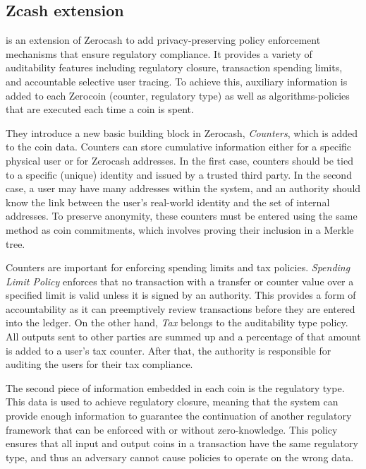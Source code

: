 \subsection{Zcash extension}

\cite{GGM16} is an extension of Zerocash \cite{Zerocash} to add privacy-preserving policy enforcement mechanisms that ensure regulatory compliance. It provides a variety of auditability features including regulatory closure, transaction spending limits, and accountable selective user tracing. To achieve this, auxiliary information is added to each Zerocoin (counter, regulatory type) as well as algorithms-policies that are executed each time a coin is spent. 

They introduce a new basic building block in Zerocash, \emph{Counters}, which is added to the coin data. Counters can store cumulative information either for a specific physical user or for Zerocash addresses. In the first case, counters should be tied to a specific (unique) identity and issued by a trusted third party. In the second case, a user may have many addresses within the system, and an authority should know the link between the user's real-world identity and the set of internal addresses. To preserve anonymity, these counters must be entered using the same method as coin commitments, which involves proving their inclusion in a Merkle tree.

Counters are important for enforcing spending limits and tax policies. \emph{Spending Limit Policy} enforces that no transaction with a transfer or counter value over a specified limit is valid unless it is signed by an authority. This provides a form of accountability as it can preemptively review transactions before they are entered into the ledger. On the other hand, \emph{Tax} belongs to the auditability type policy. All outputs sent to other parties are summed up and a percentage of that amount is added to a user's tax counter. After that, the authority is responsible for auditing the users for their tax compliance. 
 
The second piece of information embedded in each coin is the regulatory type. This data is used to achieve regulatory closure, meaning that the system can provide enough information to guarantee the continuation of another regulatory framework that can be enforced with or without zero-knowledge. This policy ensures that all input and output coins in a transaction have the same regulatory type, and thus an adversary cannot cause policies to operate on the wrong data.

